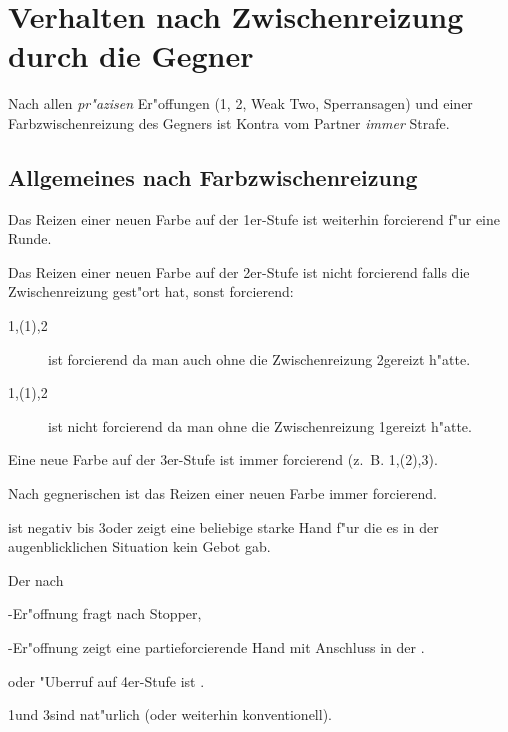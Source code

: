 \newpage

\section{Verhalten nach Zwischenreizung durch die
  Gegner\label{zwischenreizung}}

Nach allen \emph{pr"azisen} Er"offungen (1\SA, 2\SA, Weak Two, Sperransagen)
und einer Farbzwischenreizung des Gegners ist Kontra vom Partner \emph{immer}
Strafe.

\subsection{Allgemeines nach Farbzwischenreizung}
\begin{compactitem}
\item Das Reizen einer neuen Farbe auf der 1er-Stufe ist weiterhin
forcierend f"ur eine Runde.
%
\item Das Reizen einer neuen Farbe auf der 2er-Stufe ist nicht forcierend
falls die Zwischenreizung gest"ort hat, sonst forcierend:
\begin{description}
\item[1\coe{}\sep(1\pik){}\sep2\kar] ist forcierend da man auch
ohne die Zwischenreizung 2\kar gereizt h"atte.
\item[1\tre{}\sep(1\pik){}\sep2\coe] ist nicht forcierend da man ohne die
  Zwischenreizung 1\coe gereizt h"atte.
\end{description}
%
\item Eine neue Farbe auf der 3er-Stufe ist immer forcierend
  (z.~B. 1\pik{}\sep(2\kar){}\sep3\tre).
\item Nach gegnerischen  ist das Reizen einer neuen Farbe immer
  forcierend.
\item {} ist negativ bis 3\coe oder zeigt eine beliebige
  starke Hand f"ur die es in der augenblicklichen Situation kein Gebot
  gab.
\item Der  nach
  \begin{compactitem}
    \item \ufa-Er"offnung fragt nach Stopper,
    \item \ofa-Er"offnung zeigt eine partieforcierende Hand mit
      Anschluss in der \ofa.
    \end{compactitem}
\item {} oder "Uberruf auf 4er-Stufe ist .
\item 1\SA und 3\SA sind nat"urlich (oder weiterhin konventionell).
\end{compactitem}

